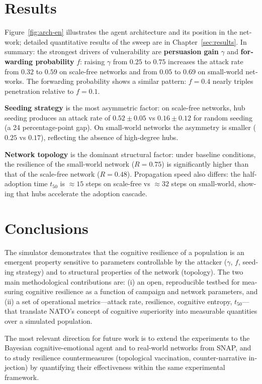 \documentclass[12pt]{extarticle}
\numberwithin{equation}{section}
\newcommand{\sectionnotoc}[1]{%
    \refstepcounter{section}%
    \section*{\thesection\quad #1}%
}
\begin{document}
\begin{otherlanguage}{english}
\sectionnotoc{Results}

Figure~\ref{fig:arch-en} illustrates the agent architecture and its position in the network; detailed quantitative results of the sweep are in Chapter~\ref{sec:results}. In summary: the strongest drivers of vulnerability are \textbf{persuasion gain} $\gamma$ and \textbf{forwarding probability} $f$: raising $\gamma$ from $0.25$ to $0.75$ increases the attack rate from $0.32$ to $0.59$ on scale-free networks and from $0.05$ to $0.69$ on small-world networks. The forwarding probability shows a similar pattern: $f = 0.4$ nearly triples penetration relative to $f = 0.1$.

\textbf{Seeding strategy} is the most asymmetric factor: on scale-free networks, hub seeding produces an attack rate of $0.52 \pm 0.05$ vs $0.16 \pm 0.12$ for random seeding (a 24 percentage-point gap). On small-world networks the asymmetry is smaller ($0.25$ vs $0.17$), reflecting the absence of high-degree hubs.

\textbf{Network topology} is the dominant structural factor: under baseline conditions, the resilience of the small-world network ($R = 0.75$) is significantly higher than that of the scale-free network ($R = 0.48$). Propagation speed also differs: the half-adoption time $t_{50}$ is $\approx 15$ steps on scale-free vs $\approx 32$ steps on small-world, showing that hubs accelerate the adoption cascade.

\sectionnotoc{Conclusions}

The simulator demonstrates that the cognitive resilience of a population is an emergent property sensitive to parameters controllable by the attacker ($\gamma$, $f$, seeding strategy) and to structural properties of the network (topology). The two main methodological contributions are: (i) an open, reproducible testbed for measuring cognitive resilience as a function of campaign and network parameters, and (ii) a set of operational metrics---attack rate, resilience, cognitive entropy, $t_{50}$---that translate NATO's concept of cognitive superiority into measurable quantities over a simulated population.

The most relevant direction for future work is to extend the experiments to the Bayesian cognitive-emotional agent and to real-world networks from SNAP, and to study resilience countermeasures (topological vaccination, counter-narrative injection) by quantifying their effectiveness within the same experimental framework.

\end{otherlanguage}
\end{document}
